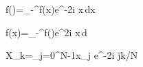 \widehat f(\xi)=\int_{-\infty}^{\infty}f(x)e^{-2\pi i x\xi}\,dx

f(x)=\int_{-\infty}^{\infty}\widehat f(\xi)e^{2\pi i x\xi}\,d\xi

X_k=\sum_{j=0}^{N-1}x_j e^{-2\pi i jk/N}
